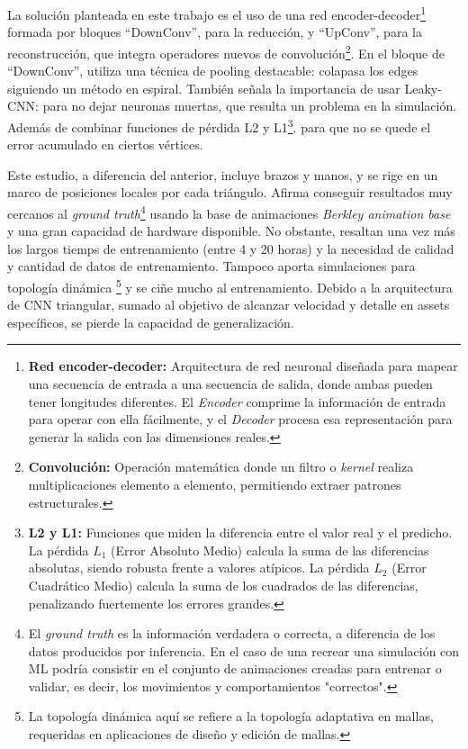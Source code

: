 La solución planteada en este trabajo es el uso de una red encoder-decoder\footnote{\textbf{Red encoder-decoder: }Arquitectura de red neuronal diseñada para mapear una secuencia de entrada a una secuencia de salida, donde ambas pueden tener longitudes diferentes. El \textit{Encoder} comprime la información de entrada para operar con ella fácilmente, y el \textit{Decoder} procesa esa representación para generar la salida con las dimensiones reales.} formada por bloques ``DownConv'', para la reducción, y ``UpConv'', para la reconstrucción, que integra operadores nuevos de convolución\footnote{\textbf{Convolución: }Operación matemática donde un filtro o \textit{kernel} realiza multiplicaciones elemento a elemento, permitiendo extraer patrones estructurales.}. En el bloque de ``DownConv'', utiliza una técnica de pooling destacable: colapasa los edges siguiendo un método en espiral. También señala la importancia de usar Leaky-CNN: para no dejar neuronas muertas, que resulta un problema en la simulación. Además de combinar funciones de pérdida L2 y L1\footnote{\textbf{L2 y L1: }Funciones que miden la diferencia entre el valor real y el predicho. La pérdida $L_1$ (Error Absoluto Medio) calcula la suma de las diferencias absolutas, siendo robusta frente a valores atípicos. La pérdida $L_2$ (Error Cuadrático Medio) calcula la suma de los cuadrados de las diferencias, penalizando fuertemente los errores grandes.}. para que no se quede el error acumulado en ciertos vértices.\newline

Este estudio, a diferencia del anterior, incluye brazos y manos, y se rige en un marco de posiciones locales por cada triángulo.
Afirma conseguir resultados muy cercanos al \textit{ground truth}\footnote{El \textit{ground truth} es la información verdadera o correcta, a diferencia de los datos producidos por inferencia. En el caso de una recrear una simulación con ML podría consistir en el conjunto de animaciones creadas para entrenar o validar, es decir, los movimientos y comportamientos "correctos".} usando la base de animaciones \textit{Berkley animation base} y una gran capacidad de hardware disponible. No obstante, resaltan una vez más los largos tiemps de entrenamiento (entre 4 y 20 horas) y la necesidad de calidad y cantidad de datos de entrenamiento. Tampoco aporta simulaciones para topología dinámica \footnote{La topología dinámica aquí se refiere a la topología adaptativa en mallas, requeridas en aplicaciones de diseño y edición de mallas.} y se ciñe mucho al entrenamiento. Debido a la arquitectura de CNN triangular, sumado al objetivo de alcanzar velocidad y detalle en assets específicos, se pierde la capacidad de generalización.  \newline

